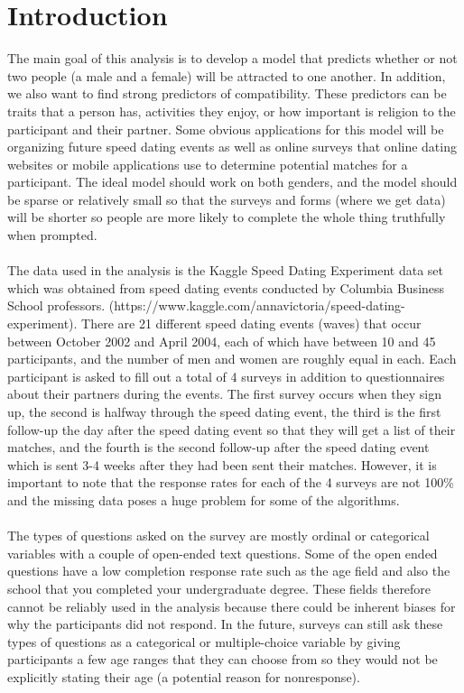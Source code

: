 \documentclass{article}
\begin{document}
\section{Introduction}
The main goal of this analysis is to develop a model that predicts whether or not two people (a male and a female) will be attracted to one another.  In addition, we also want to find strong predictors of compatibility.  These predictors can be traits that a person has, activities they enjoy, or how important is religion to the participant and their partner.  Some obvious applications for this model will be organizing future speed dating events as well as online surveys that online dating websites or mobile applications use to determine potential matches for a participant. The ideal model should work on both genders, and the model should be sparse or relatively small so that the surveys and forms (where we get data) will be shorter so people are more likely to complete the whole thing truthfully when prompted.\\
\null\\
The data used in the analysis is the Kaggle Speed Dating Experiment data set which was obtained from speed dating events conducted by Columbia Business School professors.  (https://www.kaggle.com/annavictoria/speed-dating-experiment). There are 21 different speed dating events (waves) that occur between October 2002 and April 2004, each of which have between 10 and 45 participants, and the number of men and women are roughly equal in each.  Each participant is asked to fill out a total of 4 surveys in addition to questionnaires about their partners during the events.  The first survey occurs when they sign up, the second is halfway through the speed dating event, the third is the first follow-up the day after the speed dating event so that they will get a list of their matches, and the fourth is the second follow-up after the speed dating event which is sent 3-4 weeks after they had been sent their matches. However, it is important to note that the response rates for each of the 4 surveys are not 100\% and the missing data poses a huge problem for some of the algorithms.\\
\null\\
The types of questions asked on the survey are mostly ordinal or categorical variables with a couple of open-ended text questions.  Some of the open ended questions have a low completion response rate such as the age field and also the school that you completed your undergraduate degree.  These fields therefore cannot be reliably used in the analysis because there could be inherent biases for why the participants did not respond. In the future, surveys can still ask these types of questions as a categorical or multiple-choice variable by giving participants a few age ranges that they can choose from so they would not be explicitly stating their age (a potential reason for nonresponse). 
%
\end{document}

